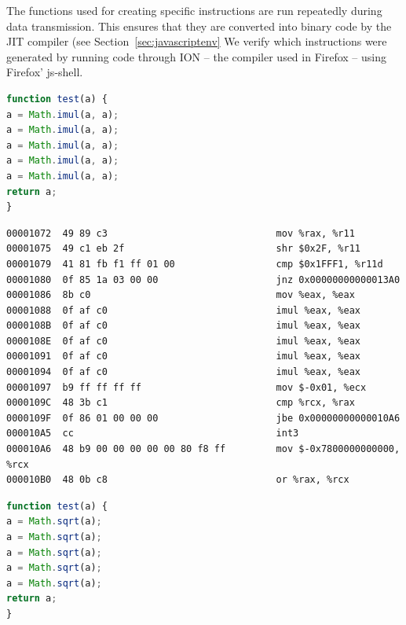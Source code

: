 \documentclass[11pt,
  titlepage=false,
  parskip=half,      %
]{scrreprt}
\begin{document}
The functions used for creating specific instructions are run repeatedly during data transmission.
This ensures that they are converted into binary code by the JIT compiler (see Section~\ref{sec:javascriptenv}
We verify which instructions were generated by running code through ION -- the compiler used in Firefox --
using Firefox' js-shell.

\begin{lstlisting}[float,caption={A test function for the \texttt{imul} instruction},label={lst:testimul},language=JavaScript]
function test(a) {
a = Math.imul(a, a);
a = Math.imul(a, a);
a = Math.imul(a, a);
a = Math.imul(a, a);
a = Math.imul(a, a);
return a;
}
\end{lstlisting}

\begin{lstlisting}[float,caption={The compiled result of the \texttt{imul} test function},label={lst:compileimul}]
00001072  49 89 c3                              mov %rax, %r11
00001075  49 c1 eb 2f                           shr $0x2F, %r11
00001079  41 81 fb f1 ff 01 00                  cmp $0x1FFF1, %r11d
00001080  0f 85 1a 03 00 00                     jnz 0x00000000000013A0
00001086  8b c0                                 mov %eax, %eax
00001088  0f af c0                              imul %eax, %eax
0000108B  0f af c0                              imul %eax, %eax
0000108E  0f af c0                              imul %eax, %eax
00001091  0f af c0                              imul %eax, %eax
00001094  0f af c0                              imul %eax, %eax
00001097  b9 ff ff ff ff                        mov $-0x01, %ecx
0000109C  48 3b c1                              cmp %rcx, %rax
0000109F  0f 86 01 00 00 00                     jbe 0x00000000000010A6
000010A5  cc                                    int3
000010A6  48 b9 00 00 00 00 00 80 f8 ff         mov $-0x7800000000000, %rcx
000010B0  48 0b c8                              or %rax, %rcx
\end{lstlisting}

\begin{lstlisting}[float,caption={A test function for the \texttt{sqrt} instruction},label={lst:testsqrt},language=JavaScript]
function test(a) {
a = Math.sqrt(a);
a = Math.sqrt(a);
a = Math.sqrt(a);
a = Math.sqrt(a);
a = Math.sqrt(a);
return a;
}
\end{lstlisting}
\end{document}
